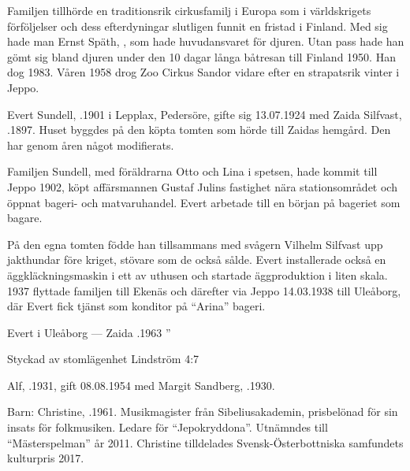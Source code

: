 Familjen tillhörde en traditionsrik cirkusfamilj i Europa som i världskrigets förföljelser och dess efterdyningar slutligen funnit en fristad i Finland. Med sig hade man Ernst Späth, , som hade huvudansvaret för djuren. Utan pass hade han gömt sig bland djuren under den 10 dagar långa båtresan till Finland 1950. Han dog 1983. Våren 1958 drog Zoo Cirkus Sandor vidare efter en strapatsrik vinter i Jeppo.


Evert Sundell, .1901 i Lepplax, Pedersöre, gifte sig 13.07.1924 med Zaida Silfvast, .1897. Huset byggdes på den köpta tomten som hörde till Zaidas hemgård. Den har genom åren något modifierats.

Familjen Sundell, med föräldrarna Otto och Lina i spetsen, hade kommit till Jeppo 1902, köpt affärsmannen Gustaf Julins fastighet nära stationsområdet och öppnat bageri- och matvaruhandel. Evert arbetade till en början på bageriet som bagare.

På den egna tomten födde han tillsammans med svågern Vilhelm Silfvast upp jakthundar före kriget, stövare som de också sålde. Evert installerade också en äggkläckningsmaskin i ett av uthusen och startade äggproduktion i liten skala. 1937 flyttade familjen till Ekenäs och därefter via Jeppo 14.03.1938 till Uleåborg, där Evert fick tjänst som konditor på ``Arina'' bageri.
\begin{jhchildren}
  \item {}
  \item {}
  \item {}
\end{jhchildren}
Evert  i Uleåborg  ---  Zaida .1963         ”




Styckad av stomlägenhet Lindström 4:7


Alf, .1931, gift 08.08.1954 med Margit Sandberg, .1930.

Barn: Christine, .1961. Musikmagister från Sibeliusakademin, prisbelönad för sin insats för folkmusiken. Ledare för ``Jepokryddona''. Utnämndes till ``Mästerspelman'' år 2011. Christine tilldelades Svensk-Österbottniska samfundets kulturpris 2017.

